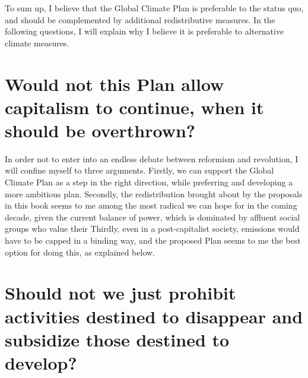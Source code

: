 \documentclass[a5paper,english,openany]{memoir}
\begin{document}
To sum up, I believe that the Global Climate Plan is preferable to the status quo, and should be complemented by additional redistributive measures. In the following questions, I will explain why I believe it is preferable to alternative climate measures. 


\section*{\normalsize Would not this Plan allow capitalism to continue, when it should be overthrown?}\label{q:capitalism}

In order %
not to enter into an endless debate between reformism and revolution, I will confine myself to three arguments. Firstly, we can support the Global Climate Plan as a step in the right direction, while preferring and developing a more ambitious plan. Secondly, the redistribution brought about by the proposals in this book seems to me among the most radical we can hope for in the coming decade, given the current balance of power, which is %
dominated by affluent social groups who value their %
Thirdly, even in a post-capitalist society, emissions would have to be capped in a binding way, and the proposed Plan seems to me the best option for doing this, as explained below. %

\section*{\normalsize Should not we just %
prohibit activities destined to disappear and subsidize %
those destined to develop?}\label{q:interdiction}
\end{document}

